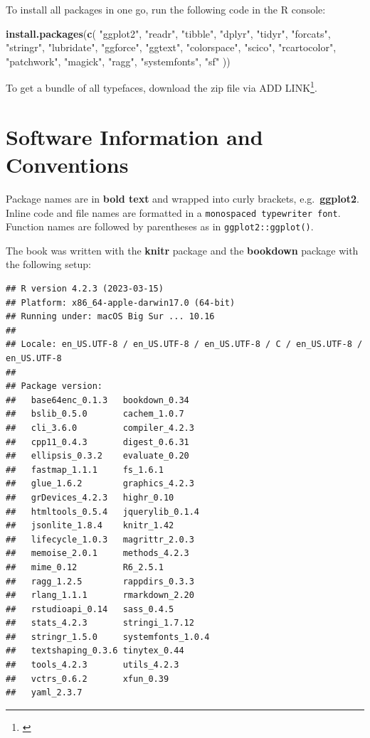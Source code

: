 \documentclass[
]{krantz}
\makeatletter
\newenvironment{Shaded}{\begin{snugshade}}{\end{snugshade}}
\newcommand{\FunctionTok}[1]{\textcolor[rgb]{0.27,0.27,0.27}{\textbf{#1}}}
\newcommand{\NormalTok}[1]{#1}
\newcommand{\StringTok}[1]{\textcolor[rgb]{0.5,0.5,0.5}{#1}}
\renewcommand{\href}[2]{#2\footnote{\url{#1}}}
\newenvironment{kframe}{%
\medskip{}
\setlength{\fboxsep}{.8em}
 \def\at@end@of@kframe{}%
 \ifinner\ifhmode%
  \def\at@end@of@kframe{\end{minipage}}%
  \begin{minipage}{\columnwidth}%
 \fi\fi%
 \def\FrameCommand##1{\hskip\@totalleftmargin \hskip-\fboxsep
 \colorbox{shadecolor}{##1}\hskip-\fboxsep
     \hskip-\linewidth \hskip-\@totalleftmargin \hskip\columnwidth}%
 \MakeFramed {\advance\hsize-\width
   \@totalleftmargin\z@ \linewidth\hsize
   \@setminipage}}%
 {\par\unskip\endMakeFramed%
 \at@end@of@kframe}
\renewenvironment{Shaded}{\begin{kframe}}{\end{kframe}}
\makeatother
\begin{document}
To install all packages in one go, run the following code in the R console:

\begin{Shaded}
\begin{Highlighting}[]
\FunctionTok{install.packages}\NormalTok{(}\FunctionTok{c}\NormalTok{(}
  \StringTok{"ggplot2"}\NormalTok{, }\StringTok{"readr"}\NormalTok{, }\StringTok{"tibble"}\NormalTok{, }\StringTok{"dplyr"}\NormalTok{, }\StringTok{"tidyr"}\NormalTok{, }\StringTok{"forcats"}\NormalTok{, }
  \StringTok{"stringr"}\NormalTok{, }\StringTok{"lubridate"}\NormalTok{, }\StringTok{"ggforce"}\NormalTok{, }\StringTok{"ggtext"}\NormalTok{, }\StringTok{"colorspace"}\NormalTok{, }\StringTok{"scico"}\NormalTok{,}
  \StringTok{"rcartocolor"}\NormalTok{, }\StringTok{"patchwork"}\NormalTok{, }\StringTok{"magick"}\NormalTok{, }\StringTok{"ragg"}\NormalTok{, }\StringTok{"systemfonts"}\NormalTok{, }\StringTok{"sf"}
\NormalTok{))}
\end{Highlighting}
\end{Shaded}

To get a bundle of all typefaces, download the zip file via \href{}{ADD LINK}.

\hypertarget{software-information-and-conventions}{%
\section*{Software Information and Conventions}\label{software-information-and-conventions}}


Package names are in \textbf{bold text} and wrapped into curly brackets, e.g.~\textbf{ggplot2}. Inline code and file names are formatted in a \texttt{monospaced\ typewriter\ font}. Function names are followed by parentheses as in \texttt{ggplot2::ggplot()}.

The book was written with the \textbf{knitr} package \citep{xie2015} and the \textbf{bookdown} package \citep{R-bookdown} with the following setup:

\begin{verbatim}
## R version 4.2.3 (2023-03-15)
## Platform: x86_64-apple-darwin17.0 (64-bit)
## Running under: macOS Big Sur ... 10.16
## 
## Locale: en_US.UTF-8 / en_US.UTF-8 / en_US.UTF-8 / C / en_US.UTF-8 / en_US.UTF-8
## 
## Package version:
##   base64enc_0.1.3   bookdown_0.34    
##   bslib_0.5.0       cachem_1.0.7     
##   cli_3.6.0         compiler_4.2.3   
##   cpp11_0.4.3       digest_0.6.31    
##   ellipsis_0.3.2    evaluate_0.20    
##   fastmap_1.1.1     fs_1.6.1         
##   glue_1.6.2        graphics_4.2.3   
##   grDevices_4.2.3   highr_0.10       
##   htmltools_0.5.4   jquerylib_0.1.4  
##   jsonlite_1.8.4    knitr_1.42       
##   lifecycle_1.0.3   magrittr_2.0.3   
##   memoise_2.0.1     methods_4.2.3    
##   mime_0.12         R6_2.5.1         
##   ragg_1.2.5        rappdirs_0.3.3   
##   rlang_1.1.1       rmarkdown_2.20   
##   rstudioapi_0.14   sass_0.4.5       
##   stats_4.2.3       stringi_1.7.12   
##   stringr_1.5.0     systemfonts_1.0.4
##   textshaping_0.3.6 tinytex_0.44     
##   tools_4.2.3       utils_4.2.3      
##   vctrs_0.6.2       xfun_0.39        
##   yaml_2.3.7
\end{verbatim}
\end{document}
